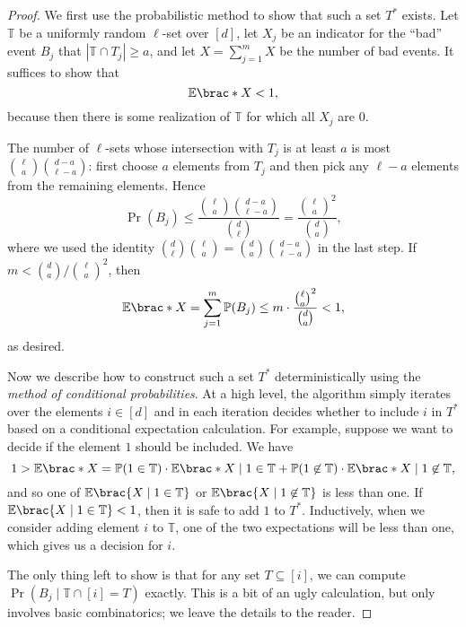 \begin{proof}
  We first use the probabilistic method to show that such a set $T^*$ exists.
  Let $\mathbb{T}$ be a uniformly random $\ell$-set over $[d]$, let $X_j$
  be an indicator for the ``bad'' event $B_j$ that $|\mathbb{T} \cap T_j| \ge
  a$, and let $X = \sum_{j=1}^m X$ be the number of bad events. It suffices to
  show that \[
    \Exp\brac*{X} < 1,
  \]
  because then there is some realization of $\mathbb{T}$ for which all $X_j$
  are 0.

  The number of $\ell$-sets whose intersection with $T_j$ is at least $a$ is
  most $\binom{\ell}{a}\binom{d - a}{\ell - a}$: first choose $a$ elements from
  $T_j$ and then pick any $\ell - a$ elements from the remaining elements. Hence
  \[
    \Pr(B_j) \le \frac{\binom{\ell}{a}\binom{d - a}{\ell - a}}{\binom{d}{\ell}} =
    \frac{\binom{\ell}{a}^2}{\binom{d}{a}},
  \]
  where we used the identity $\binom{d}{\ell}\binom{\ell}{a} =
  \binom{d}{a}\binom{d - a}{\ell - a}$ in the last step. If $m < \binom{d}{a} /
  \binom{\ell}{a}^2$, then \[
    \Exp\brac*{X} =
    \sum_{j=1}^m \Pr(B_j) \le m \cdot \frac{\binom{\ell}{a}^2}{\binom{d}{a}} < 1,
  \]
  as desired.

  Now we describe how to construct such a set $T^*$ deterministically using the
  \emph{method of conditional probabilities}. At a high level, the algorithm
  simply iterates over the elements $i \in [d]$ and in each iteration decides
  whether to include $i$ in $T^*$ based on a conditional expectation
  calculation. For example, suppose we want to decide if the element $1$ should
  be included. We have \[
    1 > \Exp\brac*{X} = \Pr(1 \in \mathbb{T}) \cdot \Exp\brac*{X \mid 1 \in \mathbb{T}} 
      + \Pr(1 \not\in \mathbb{T}) \cdot \Exp\brac*{X \mid 1 \not\in \mathbb{T}},
  \]
  and so one of $\Exp\brac{X \mid 1 \in \mathbb{T}}$ or $\Exp\brac{X \mid 1 \not\in
  \mathbb{T}}$ is less than one. If $\Exp\brac{X \mid 1 \in \mathbb{T}} < 1$,
  then it is safe to add $1$ to $T^*$. Inductively, when we consider adding
  element $i$ to $\mathbb{T}$, one of the two expectations will be less than
  one, which gives us a decision for $i$.

  The only thing left to show is that for any set $T \subseteq [i]$, we can
  compute $\Pr(B_j \mid \mathbb{T} \cap [i] = T)$ exactly. This is a bit of an
  ugly calculation, but only involves basic combinatorics; we leave the details
  to the reader.
\end{proof}

